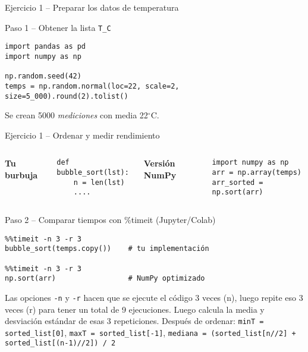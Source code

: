 \documentclass[10pt]{beamer}
\begin{document}
\begin{frame}[fragile]{Ejercicio 1 – Preparar los datos de temperatura}
  \begin{block}{Paso 1 – Obtener la lista \texttt{T\_C}}
  \begin{verbatim}
import pandas as pd
import numpy as np

np.random.seed(42)
temps = np.random.normal(loc=22, scale=2, size=5_000).round(2).tolist()
  \end{verbatim}
  \vspace{-0.4em}
  \small
   Se crean 5000 \textit{mediciones} con media 22$^\circ$C.
  \end{block}
\end{frame}

\begin{frame}[fragile]{Ejercicio 1 -- Ordenar y medir rendimiento}
\vspace{0.3cm}
\begin{columns}
\vspace{-0.2cm}
{\scriptsize\textbf{Tu burbuja}}
\begin{verbatim}
def bubble_sort(lst):
    n = len(lst)
    ....
\end{verbatim}

\vspace{-0.2cm}
{\scriptsize\textbf{Versión NumPy}}
\begin{verbatim}
import numpy as np
arr = np.array(temps)
arr_sorted = np.sort(arr) 
\end{verbatim}
\end{columns}

\vspace{0.3em}
{\footnotesize
\begin{block}{Paso 2 – Comparar tiempos con \%timeit (Jupyter/Colab)}
\begin{verbatim}
%%timeit -n 3 -r 3
bubble_sort(temps.copy())    # tu implementación

%%timeit -n 3 -r 3
np.sort(arr)                 # NumPy optimizado
\end{verbatim}
\end{block}
}

{\scriptsize
Las opciones \texttt{-n} y \texttt{-r} hacen que se ejecute el código 3 veces (n), luego repite eso 3 veces (r) para tener un total de 9 ejecuciones. Luego calcula la media y desviación estándar de esas 3 repeticiones.
Después de ordenar:  
\texttt{minT = sorted\_list[0]}, \texttt{maxT = sorted\_list[-1]},  
\texttt{mediana = (sorted\_list[n//2] + sorted\_list[(n-1)//2]) / 2}
}
\end{frame}
\end{document}
